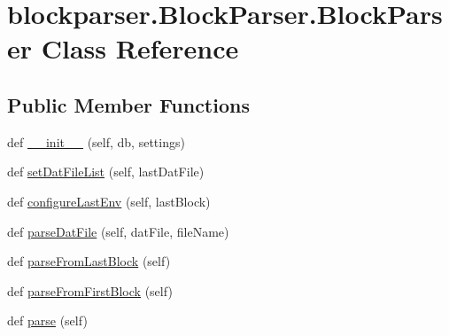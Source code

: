 \hypertarget{classblockparser_1_1BlockParser_1_1BlockParser}{}\section{blockparser.\+Block\+Parser.\+Block\+Parser Class Reference}
\label{classblockparser_1_1BlockParser_1_1BlockParser}
\subsection*{Public Member Functions}
\begin{DoxyCompactItemize}
\item 
def \hyperlink{classblockparser_1_1BlockParser_1_1BlockParser_ad1094fe979d35e4eff2380b404909a92}{\+\_\+\+\_\+init\+\_\+\+\_\+} (self, db, settings)
\item 
def \hyperlink{classblockparser_1_1BlockParser_1_1BlockParser_aee23b7d64503eb9b24e7597a686dbbf1}{set\+Dat\+File\+List} (self, last\+Dat\+File)
\item 
def \hyperlink{classblockparser_1_1BlockParser_1_1BlockParser_aab7c78182e3e135a39b871ef2c0a32a8}{configure\+Last\+Env} (self, last\+Block)
\item 
def \hyperlink{classblockparser_1_1BlockParser_1_1BlockParser_a038877292e88ae1aaf723498684050e7}{parse\+Dat\+File} (self, dat\+File, file\+Name)
\item 
def \hyperlink{classblockparser_1_1BlockParser_1_1BlockParser_a818a8f39ef4460318516fee34dfdefb8}{parse\+From\+Last\+Block} (self)
\item 
def \hyperlink{classblockparser_1_1BlockParser_1_1BlockParser_ab4fb41cc646323beadeea6a031a6446d}{parse\+From\+First\+Block} (self)
\item 
def \hyperlink{classblockparser_1_1BlockParser_1_1BlockParser_a03801bd220df523f41c51ab3587fbb76}{parse} (self)
\end{DoxyCompactItemize}
